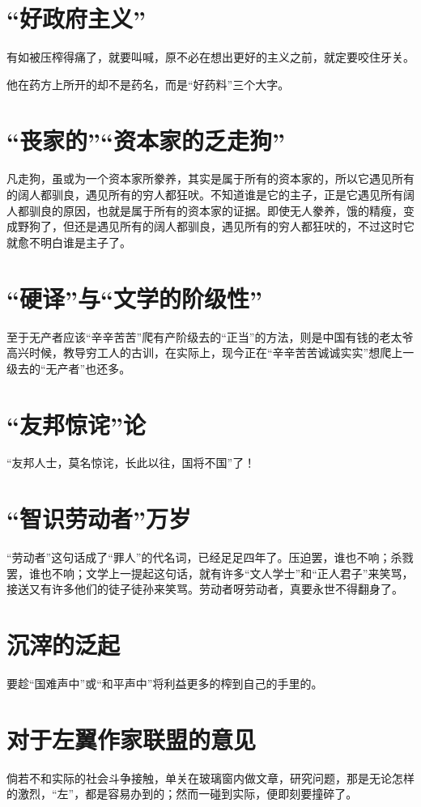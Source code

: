 \documentclass[a4paper]{ctexart}
\begin{document}
\begin{sloppy}
        \section{
            “好政府主义”
        }
        有如被压榨得痛了，就要叫喊，原不必在想出更好的主义之前，就定要咬住牙关。

        他在药方上所开的却不是药名，而是“好药料”三个大字。

        \section{
            “丧家的”“资本家的乏走狗”
        }
        凡走狗，虽或为一个资本家所豢养，其实是属于所有的资本家的，所以它遇见所有的阔人都驯良，遇见所有的穷人都狂吠。不知道谁是它的主子，正是它遇见所有阔人都驯良的原因，也就是属于所有的资本家的证据。即使无人豢养，饿的精瘦，变成野狗了，但还是遇见所有的阔人都驯良，遇见所有的穷人都狂吠的，不过这时它就愈不明白谁是主子了。

        \section{
            “硬译”与“文学的阶级性”
        }
        至于无产者应该“辛辛苦苦”爬有产阶级去的“正当”的方法，则是中国有钱的老太爷高兴时候，教导穷工人的古训，在实际上，现今正在“辛辛苦苦诚诚实实”想爬上一级去的“无产者”也还多。

        \section{
            “友邦惊诧”论
        }
        “友邦人士，莫名惊诧，长此以往，国将不国”了！

        \section{
            “智识劳动者”万岁
        }
        “劳动者”这句话成了“罪人”的代名词，已经足足四年了。压迫罢，谁也不响；杀戮罢，谁也不响；文学上一提起这句话，就有许多“文人学士”和“正人君子”来笑骂，接送又有许多他们的徒子徒孙来笑骂。劳动者呀劳动者，真要永世不得翻身了。

        \section{
            沉滓的泛起
        }
        要趁“国难声中”或“和平声中”将利益更多的榨到自己的手里的。

        \section{
            对于左翼作家联盟的意见
        }
        倘若不和实际的社会斗争接触，单关在玻璃窗内做文章，研究问题，那是无论怎样的激烈，“左”，都是容易办到的；然而一碰到实际，便即刻要撞碎了。


\end{sloppy}
\end{document}
